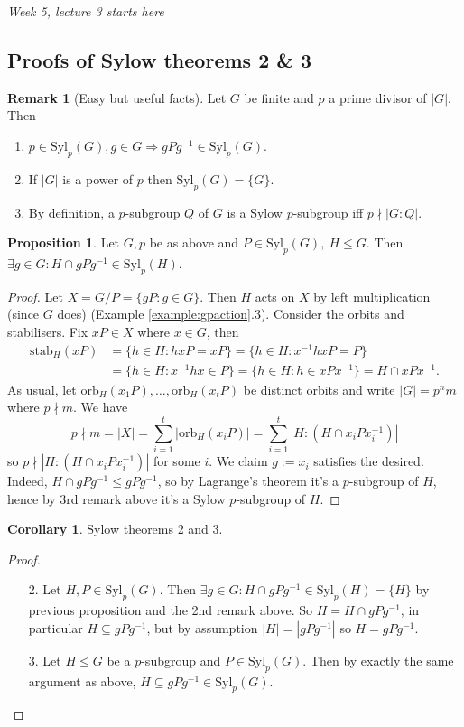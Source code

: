 \documentclass[a4paper]{article}
\newcommand{\Syl}{\text{Syl}}
\newcommand{\orb}{\text{orb}}
\newcommand{\stab}{\text{stab}}
\theoremstyle{definition}
\newtheorem{prop}[defn]{Proposition}
\newtheorem{coro}[defn]{Corollary}
\newtheorem*{remark}{Remark}
\begin{document}
\begin{flushright}
\textit{Week 5, lecture 3 starts here}
\end{flushright}

\subsection{Proofs of Sylow theorems 2 \& 3}
\begin{remark}[Easy but useful facts]
Let $G$ be finite and $p$ a prime divisor of $|G|$. Then
\begin{enumerate}
\item $p\in\Syl_p(G),g\in G\Rightarrow gPg^{-1}\in\Syl_p(G)$.
\item If $|G|$ is a power of $p$ then $\Syl_p(G)=\{G\}$.
\item By definition, a $p$-subgroup $Q$ of $G$ is a Sylow $p$-subgroup iff $p\nmid |G:Q|$.
\end{enumerate}
\end{remark}

\begin{prop}
Let $G,p$ be as above and $P\in\Syl_p(G),\ H\leq G$. Then $\exists g\in G:H\cap gPg^{-1}\in\Syl_p(H)$.
\end{prop}
\begin{proof}
Let $X=G/P=\{gP:g\in G\}$. Then $H$ acts on $X$ by left multiplication (since $G$ does) (Example \ref{example:gpaction}.3). Consider the orbits and stabilisers. Fix $xP\in X$ where $x\in G$, then
\[
\begin{aligned}
\stab_H(xP)&=\{h\in H:hxP=xP\}=\{h\in H:x^{-1}hxP=P\}\\
&=\{h\in H:x^{-1}hx\in P\}=\{h\in H:h\in xPx^{-1}\}=H\cap xPx^{-1}.
\end{aligned}
\]
As usual, let $\orb_H(x_1P),\ldots,\orb_H(x_tP)$ be distinct orbits and write $|G|=p^n m$ where $p\nmid m$. We have
\[
p\nmid m=|X|=\sum_{i=1}^t \left|\orb_H(x_i P)\right|=\sum_{i=1}^t \left|H:\left(H\cap x_i Px_i^{-1}\right)\right|
\]
so $p\nmid \left|H:\left(H\cap x_i Px_i^{-1}\right)\right|$ for some $i$. We claim $g:=x_i$ satisfies the desired. Indeed, $H\cap gPg^{-1} \leq gPg^{-1}$, so by Lagrange's theorem it's a $p$-subgroup of $H$, hence by 3rd remark above it's a Sylow $p$-subgroup of $H$.
\end{proof}

\begin{coro}
Sylow theorems 2 and 3.
\end{coro}
\begin{proof}
\begin{enumerate}
\item[2.] Let $H,P\in\Syl_p(G)$. Then $\exists g\in G:H\cap gPg^{-1}\in \Syl_p(H)=\{H\}$ by previous proposition and the 2nd remark above. So $H=H\cap gPg^{-1}$, in particular $H\subseteq gPg^{-1}$, but by assumption $|H|=|gPg^{-1}|$ so $H=gPg^{-1}$.
\item[3.] Let $H\leq G$ be a $p$-subgroup and $P\in\Syl_p(G)$. Then by exactly the same argument as above, $H\subseteq gPg^{-1}\in\Syl_p(G)$.
\end{enumerate}
\end{proof}
\end{document}
